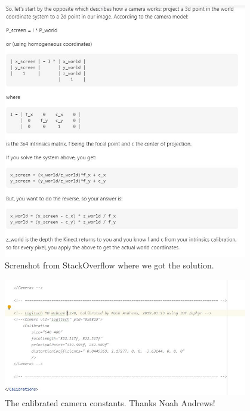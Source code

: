 \begin{figure}[htp]
\centering
\includegraphics[width=0.95\textwidth, angle=0]{Meetings/March/03-29-22/03-29-22 4.JPG}
\caption{Screnshot from StackOverflow where we got the solution.}
\label{fig:032922_4}
\end{figure}

\begin{figure}[htp]
\centering
\includegraphics[width=0.95\textwidth, angle=0]{Meetings/March/03-29-22/03-29-22 5.JPG}
\caption{The calibrated camera constants. Thanks Noah Andrews!}
\label{fig:032922_5}
\end{figure}



